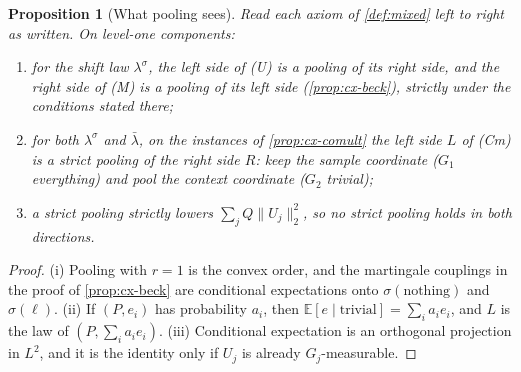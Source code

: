 \documentclass[11pt]{article}
\newtheorem{proposition}[theorem]{Proposition}
\theoremstyle{definition}
\theoremstyle{remark}
\newcommand{\lb}{\bar\lambda}
\newcommand{\ls}{\lambda^{\sigma}}
\begin{document}
\begin{proposition}[What pooling sees]\label{prop:pooling-sees}
Read each axiom of \cref{def:mixed} left to right as written. On level-one components:
\begin{enumerate}[label=(\roman*)]
\item for the shift law $\ls$, the left side of (U) is a pooling of its right side, and the right side of (M) is a pooling of its left
  side (\cref{prop:cx-beck}), strictly under the conditions stated there;
\item for both $\ls$ and $\lb$, on the instances of \cref{prop:cx-comult} the left side $L$ of (Cm) is a strict pooling of the right
  side $R$: keep the sample coordinate ($G_1$ everything) and pool the context coordinate ($G_2$ trivial);
\item a strict pooling strictly lowers $\sum_jQ\lVert U_j\rVert_2^2$, so no strict pooling holds in both directions.
\end{enumerate}
\end{proposition}
\begin{proof}
(i) Pooling with $r=1$ is the convex order, and the martingale couplings in the proof of \cref{prop:cx-beck} are conditional
expectations onto $\sigma(\text{nothing})$ and $\sigma(\ell)$. (ii) If $(P,e_i)$ has probability $a_i$, then $\mathbb E[e\mid\text{trivial}]=\sum_ia_ie_i$,
and $L$ is the law of $(P,\sum_ia_ie_i)$. (iii) Conditional expectation is an orthogonal projection in $L^2$, and it is the identity
only if $U_j$ is already $G_j$-measurable.
\end{proof}
\end{document}
